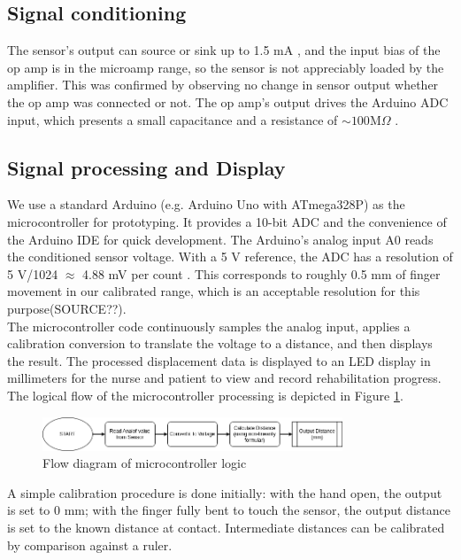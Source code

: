 \documentclass[a4paper,12pt]{article}
\begin{document}
\subsection{Signal conditioning}
The sensor’s output can source or sink up to 1.5 mA  \cite{ti_datasheet}, and the input bias of the op amp is in the microamp range, so the sensor is not appreciably loaded by the amplifier. This was confirmed by observing no change in sensor output whether the op amp was connected or not. The op amp’s output drives the Arduino ADC input, which presents a small capacitance and a resistance of $\sim 100 \text{M} \Omega$ \cite{arduino}.

\subsection{Signal processing and Display}
We use a standard Arduino (e.g. Arduino Uno with ATmega328P) as the microcontroller for prototyping. It provides a 10-bit ADC and the convenience of the Arduino IDE for quick development. The Arduino’s analog input A0 reads the conditioned sensor voltage. With a 5 V reference, the ADC has a resolution of 5 V/1024 $\approx$ 4.88 mV per count \cite{hu2025adc}. This corresponds to roughly 0.5 mm of finger movement in our calibrated range, which is an acceptable resolution for this purpose(SOURCE??).\\ 
The microcontroller code continuously samples the analog input, applies a calibration conversion to translate the voltage to a distance, and then displays the result. The processed displacement data is displayed to an LED display in millimeters for the nurse and patient to view and record rehabilitation progress. The logical flow of the microcontroller processing is depicted in Figure \ref{fig:flow}.
\begin{figure}[ht]
    \centering
    \includegraphics[width=0.8\textwidth]{LabMCUFlow.png}
    \caption{Flow diagram of microcontroller logic}
    \label{fig:flow}
\end{figure}
A simple calibration procedure is done initially: with the hand open, the output is set to 0 mm; with the finger fully bent to touch the sensor, the output distance is set to the known distance at contact. Intermediate distances can be calibrated by comparison against a ruler. 
\end{document}
